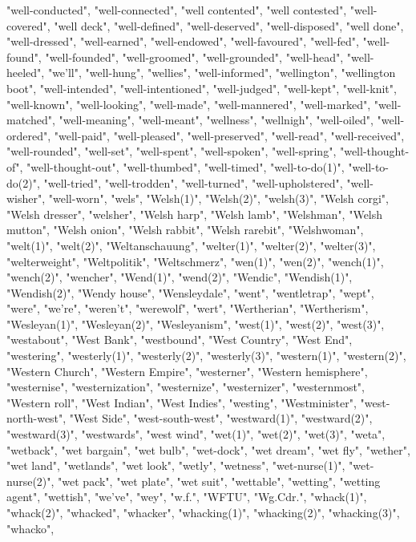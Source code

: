 "well-conducted",
"well-connected",
"well contented",
"well contested",
"well-covered",
"well deck",
"well-defined",
"well-deserved",
"well-disposed",
"well done",
"well-dressed",
"well-earned",
"well-endowed",
"well-favoured",
"well-fed",
"well-found",
"well-founded",
"well-groomed",
"well-grounded",
"well-head",
"well-heeled",
"we'll",
"well-hung",
"wellies",
"well-informed",
"wellington",
"wellington boot",
"well-intended",
"well-intentioned",
"well-judged",
"well-kept",
"well-knit",
"well-known",
"well-looking",
"well-made",
"well-mannered",
"well-marked",
"well-matched",
"well-meaning",
"well-meant",
"wellness",
"wellnigh",
"well-oiled",
"well-ordered",
"well-paid",
"well-pleased",
"well-preserved",
"well-read",
"well-received",
"well-rounded",
"well-set",
"well-spent",
"well-spoken",
"well-spring",
"well-thought-of",
"well-thought-out",
"well-thumbed",
"well-timed",
"well-to-do(1)",
"well-to-do(2)",
"well-tried",
"well-trodden",
"well-turned",
"well-upholstered",
"well-wisher",
"well-worn",
"wels",
"Welsh(1)",
"Welsh(2)",
"welsh(3)",
"Welsh corgi",
"Welsh dresser",
"welsher",
"Welsh harp",
"Welsh lamb",
"Welshman",
"Welsh mutton",
"Welsh onion",
"Welsh rabbit",
"Welsh rarebit",
"Welshwoman",
"welt(1)",
"welt(2)",
"Weltanschauung",
"welter(1)",
"welter(2)",
"welter(3)",
"welterweight",
"Weltpolitik",
"Weltschmerz",
"wen(1)",
"wen(2)",
"wench(1)",
"wench(2)",
"wencher",
"Wend(1)",
"wend(2)",
"Wendic",
"Wendish(1)",
"Wendish(2)",
"Wendy house",
"Wensleydale",
"went",
"wentletrap",
"wept",
"were",
"we're",
"weren't",
"werewolf",
"wert",
"Wertherian",
"Wertherism",
"Wesleyan(1)",
"Wesleyan(2)",
"Wesleyanism",
"west(1)",
"west(2)",
"west(3)",
"westabout",
"West Bank",
"westbound",
"West Country",
"West End",
"westering",
"westerly(1)",
"westerly(2)",
"westerly(3)",
"western(1)",
"western(2)",
"Western Church",
"Western Empire",
"westerner",
"Western hemisphere",
"westernise",
"westernization",
"westernize",
"westernizer",
"westernmost",
"Western roll",
"West Indian",
"West Indies",
"westing",
"Westminister",
"west-north-west",
"West Side",
"west-south-west",
"westward(1)",
"westward(2)",
"westward(3)",
"westwards",
"west wind",
"wet(1)",
"wet(2)",
"wet(3)",
"weta",
"wetback",
"wet bargain",
"wet bulb",
"wet-dock",
"wet dream",
"wet fly",
"wether",
"wet land",
"wetlands",
"wet look",
"wetly",
"wetness",
"wet-nurse(1)",
"wet-nurse(2)",
"wet pack",
"wet plate",
"wet suit",
"wettable",
"wetting",
"wetting agent",
"wettish",
"we've",
"wey",
"w.f.",
"WFTU",
"Wg.Cdr.",
"whack(1)",
"whack(2)",
"whacked",
"whacker",
"whacking(1)",
"whacking(2)",
"whacking(3)",
"whacko",
